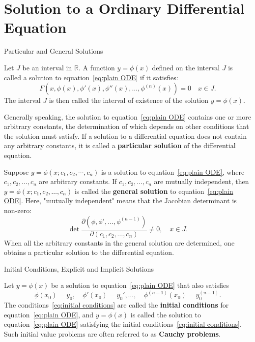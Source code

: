 \documentclass[11pt]{../../TexTemplate/elegantbook}
\begin{document}
\section{Solution to a Ordinary Differential Equation}
\begin{leftbarTitle}{Particular and General Solutions}\end{leftbarTitle}
Let $J$ be an interval in $\mathbb{R}$. 
A function $y=\phi(x)$ defined on the interval $J$ is called a solution to equation~\eqref{eq:plain ODE} if it satisfies: 
\[
F(x, \phi(x), \phi'(x), \phi''(x), \dots, \phi^{(n)}(x)) = 0 \quad x \in J. 
\]
The interval $J$ is then called the interval of existence of the solution $y = \phi(x)$.

Generally speaking, 
the solution to equation~\eqref{eq:plain ODE} contains one or more arbitrary constants, 
the determination of which depends on other conditions that the solution must satisfy. 
If a solution to a differential equation does not contain any arbitrary constants, 
it is called a \textbf{particular solution} of the differential equation.

Suppose $y = \phi(x; c_{1}, c_{2}, \cdots, c_{n})$ is a solution to equation~\eqref{eq:plain ODE}, 
where $c_{1}, c_{2}, \ldots, c_{n}$ are arbitrary constants. 
If $c_{1}, c_{2}, \ldots, c_{n}$ are mutually independent, 
then $y = \phi(x; c_{1}, c_{2}, \ldots, c_{n})$ is called the \textbf{general solution} to equation~\eqref{eq:plain ODE}. 
Here, "mutually independent" means that the Jacobian determinant is non-zero: 
\[
\det \frac{\partial(\phi, \phi', \dots, \phi^{(n-1)})}{\partial(c_1, c_2, \dots, c_n)} \neq 0, \quad x \in J.
\]
When all the arbitrary constants in the general solution are determined, 
one obtains a particular solution to the differential equation.

\begin{leftbarTitle}{Initial Conditions, Explicit and Implicit Solutions}\end{leftbarTitle}
Let $y = \phi(x)$ be a solution to equation~\eqref{eq:plain ODE} that also satisfies 
\begin{equation}\label{eq:initial conditions}
    \phi(x_0) = y_0, \quad \phi'(x_0) = y_0', \dots, \quad \phi^{(n-1)}(x_0) = y_0^{(n-1)}.
\end{equation}
The conditions~\eqref{eq:initial conditions} are called the \textbf{initial conditions} for equation~\eqref{eq:plain ODE}, 
and $y = \phi(x)$ is called the solution to equation~\eqref{eq:plain ODE} 
satisfying the initial conditions~\eqref{eq:initial conditions}.
Such initial value problems are often referred to as \textbf{Cauchy problems}.
\end{document}
